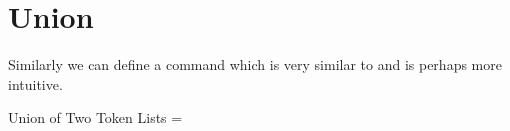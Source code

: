 \section{Union}
Similarly we can define a command \cmd{\Union} which is very similar to \cmd{\JoinToks} and is perhaps more intuitive.


\begin{texexample}{Union of Two Token Lists}{}
\def\Union(#1,#2){\expandafter\expandafter\expandafter
{\expandafter\the\expandafter#1\the#2}}
=\Union(,) 
\the{}
\end{texexample}



\begin{comment}

\subsection{Helper Macros}
The next macros are helper macros to assist in the rest of the definitions. The \cmd{\UpToHere} macro is a simple \cmd{\relax}, where the \cmd{\IgnoreRest} and \cmd{\IgnoreFirst} are defined as per their names.

\begin{teX}
%
\def\UpToHere{\relax}%
\def\IgnoreRest#1#2\UpToHere{#1} %
\def\IgnoreFirst#1#2\relax\UpToHere{#2} %
\end{teX}


\begin{teX}

%
\def\First#1{\expandafter\IgnoreRest\the#1{}\UpToHere}

%
\def\FirstOf#1{\expandafter\expandafter\expandafter
{\expandafter\IgnoreRest\the#1{}\UpToHere}}

%
\def\MoveFirst(#1to#2){#2=\FirstOf{#1}}

%
\def\Rest#1{\expandafter\IgnoreFirst\the#1\relax\UpToHere}

%
\def\RestOf#1{\expandafter\expandafter\expandafter
{\expandafter\IgnoreFirst\the#1\relax\UpToHere}}


\end{comment}
